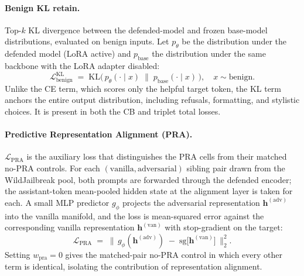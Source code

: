 \paragraph{Benign KL retain.}
Top-\(k\) KL divergence between the defended-model and frozen base-model
distributions, evaluated on benign inputs.  Let \(p_\theta\) be the
distribution under the defended model (LoRA active) and \(p_\text{base}\)
the distribution under the same backbone with the LoRA adapter disabled:
\begin{equation}
  \mathcal{L}^\text{KL}_\text{benign}
  \;=\;
  \mathrm{KL}\!\bigl(\,p_\theta(\cdot \mid x) \;\big\|\; p_\text{base}(\cdot \mid x)\,\bigr),
  \quad x \sim \text{benign}.
  \label{eq:benign-kl}
\end{equation}
Unlike the CE term, which scores only the helpful target token, the
KL term anchors the entire output distribution, including refusals,
formatting, and stylistic choices.  It is present in both the CB and
triplet total losses.

\paragraph{Predictive Representation Alignment (PRA).}
\(\mathcal{L}_\text{PRA}\) is the auxiliary loss that distinguishes
the PRA cells from their matched no-PRA controls.  For each
\((\text{vanilla}, \text{adversarial})\) sibling pair drawn from the
WildJailbreak pool, both prompts are forwarded through the defended
encoder; the assistant-token mean-pooled hidden state at the
alignment layer is taken for each.  A small MLP predictor
\(g_\phi\) projects the adversarial representation
\(\mathbf{h}^{(\text{adv})}\) into the vanilla manifold, and the loss
is mean-squared error against the corresponding vanilla
representation \(\mathbf{h}^{(\text{van})}\) with stop-gradient on
the target:
\begin{equation}
  \mathcal{L}_\text{PRA}
  \;=\;
  \bigl\lVert\, g_\phi(\mathbf{h}^{(\text{adv})}) \;-\; \mathrm{sg}\bigl[\mathbf{h}^{(\text{van})}\bigr] \,\bigr\rVert_2^2.
  \label{eq:pra}
\end{equation}
Setting \(w_\text{pra}\!=\!0\) gives the matched-pair no-PRA control
in which every other term is identical, isolating the contribution
of representation alignment.

